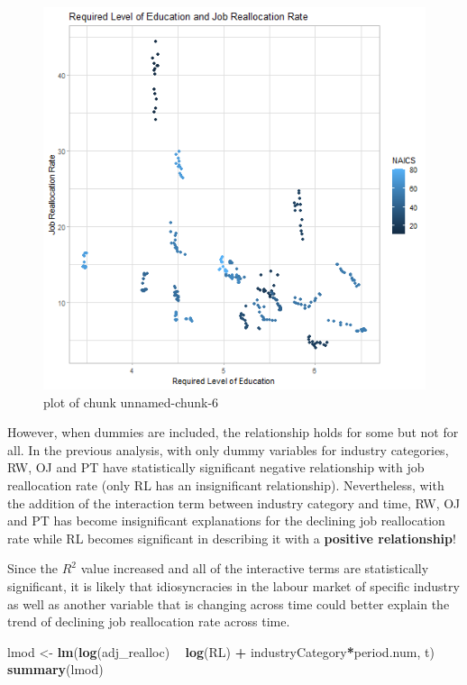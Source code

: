 \documentclass[
]{article}
\newenvironment{Shaded}{\begin{snugshade}}{\end{snugshade}}
\newcommand{\KeywordTok}[1]{\textcolor[rgb]{0.13,0.29,0.53}{\textbf{#1}}}
\newcommand{\NormalTok}[1]{#1}
\newcommand{\OperatorTok}[1]{\textcolor[rgb]{0.81,0.36,0.00}{\textbf{#1}}}
\newcommand{\StringTok}[1]{\textcolor[rgb]{0.31,0.60,0.02}{#1}}
\begin{document}
\begin{figure}
\centering
\includegraphics{figure/unnamed-chunk-6-1.png}
\caption{plot of chunk unnamed-chunk-6}
\end{figure}

However, when dummies are included, the relationship holds for some but
not for all. In the previous analysis, with only dummy variables for
industry categories, RW, OJ and PT have statistically significant
negative relationship with job reallocation rate (only RL has an
insignificant relationship). Nevertheless, with the addition of the
interaction term between industry category and time, RW, OJ and PT has
become insignificant explanations for the declining job reallocation
rate while RL becomes significant in describing it with a
\textbf{positive relationship}!

Since the \(R^2\) value increased and all of the interactive terms are
statistically significant, it is likely that idiosyncracies in the
labour market of specific industry as well as another variable that is
changing across time could better explain the trend of declining job
reallocation rate across time.

\begin{Shaded}
\begin{Highlighting}[]
\NormalTok{lmod <-}\StringTok{ }\KeywordTok{lm}\NormalTok{(}\KeywordTok{log}\NormalTok{(adj_realloc) }\OperatorTok{~}\StringTok{ }\KeywordTok{log}\NormalTok{(RL) }\OperatorTok{+}\StringTok{ }\NormalTok{industryCategory}\OperatorTok{*}\NormalTok{period.num, t)}
\KeywordTok{summary}\NormalTok{(lmod)}
\end{Highlighting}
\end{Shaded}
\end{document}
